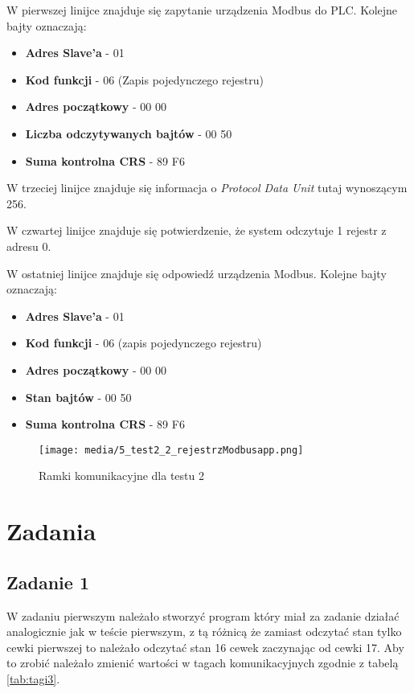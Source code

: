 \documentclass{article}
\begin{document}
W pierwszej linijce znajduje się zapytanie urządzenia Modbus do PLC. Kolejne bajty oznaczają:
\begin{itemize}
    \item \textbf{Adres Slave'a} - 01
    \item \textbf{Kod funkcji} - 06 (Zapis pojedynczego rejestru)
    \item \textbf{Adres początkowy} - 00 00
    \item \textbf{Liczba odczytywanych bajtów} - 00 50
    \item \textbf{Suma kontrolna CRS} - 89 F6
\end{itemize}


W trzeciej linijce znajduje się informacja o \textit{Protocol Data Unit} tutaj wynoszącym 256.

W czwartej linijce znajduje się potwierdzenie, że system odczytuje 1 rejestr z adresu 0.

W ostatniej linijce znajduje się odpowiedź urządzenia Modbus. Kolejne bajty oznaczają:
\begin{itemize}
    \item \textbf{Adres Slave'a} - 01
    \item \textbf{Kod funkcji} - 06 (zapis pojedynczego rejestru)
    \item \textbf{Adres początkowy} - 00 00 
    \item \textbf{Stan bajtów} - 00 50
    \item \textbf{Suma kontrolna CRS} - 89 F6
\end{itemize}


\begin{figure}[H]
    \centering
    \texttt{[image: media/5\_test2\_2\_rejestrzModbusapp.png]}
    \caption{Ramki komunikacyjne dla testu 2}
    \label{fig:zdj15}
\end{figure}

\newpage
\section{Zadania}
\subsection{Zadanie 1}
W zadaniu pierwszym należało stworzyć program który miał za zadanie działać analogicznie jak w teście pierwszym, z tą różnicą że zamiast odczytać stan tylko cewki pierwszej to należało odczytać stan 16 cewek zaczynając od cewki 17. Aby to zrobić należało zmienić wartości w tagach komunikacyjnych zgodnie z tabelą \ref{tab:tagi3}.
\end{document}
